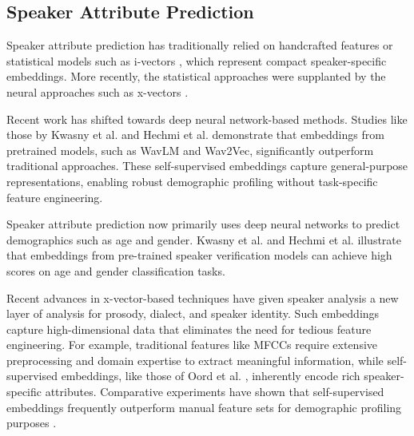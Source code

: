 

\subsection{Speaker Attribute Prediction} 
Speaker attribute prediction has traditionally relied on handcrafted features or statistical models such as i-vectors \cite{dehak2010front}, which represent compact speaker-specific embeddings.
More recently, the statistical approaches were supplanted by the neural approaches such as x-vectors \cite{snyder2018x}.

Recent work has shifted towards deep neural network-based methods. Studies like those by Kwasny et al. \cite{kwasny2020agegender} and Hechmi et al. \cite{hechmi2021voxceleb} demonstrate that embeddings from pretrained models, such as WavLM and Wav2Vec, significantly outperform traditional approaches. These self-supervised embeddings capture general-purpose representations, enabling robust demographic profiling without task-specific feature engineering.

Speaker attribute prediction now primarily uses deep neural networks to predict demographics such as age and gender\cite{almomani2023age}. 
Kwasny et al. \cite{kwasny2020agegender} and Hechmi et al. \cite{hechmi2021voxceleb} illustrate that embeddings from pre-trained speaker verification models can achieve high scores on age and gender classification tasks. 

Recent advances in x-vector-based techniques have given speaker analysis a new layer of analysis for prosody, dialect, and speaker identity. Such embeddings capture high-dimensional data that eliminates the need for tedious feature engineering. For example, traditional features like MFCCs require extensive preprocessing and domain expertise to extract meaningful information, while self-supervised embeddings, like those of Oord et al. \cite{oord2018cpc}, inherently encode rich speaker-specific attributes. Comparative experiments have shown that self-supervised embeddings frequently outperform manual feature sets for demographic profiling purposes \cite{ericsson2021selfsupervised}.

